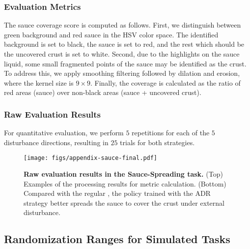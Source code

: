 \begin{appendix}
\subsubsection{Evaluation Metrics}
\label{sec:appendix-disturb-metric}
The sauce coverage score is computed as follows. First, we distinguish between green background and red sauce in the HSV color space. The identified background is set to black, the sauce is set to red, and the rest which should be the uncovered crust is set to white. Second, due to the highlights on the sauce liquid, some small fragmented points of the sauce may be identified as the crust. To address this, we apply smoothing filtering followed by dilation and erosion, where the kernel size is $9\times 9$. Finally, the coverage is calculated as the ratio of red areas (sauce) over non-black areas (sauce + uncovered crust). 

\vspace{0.2cm}
\subsubsection{Raw Evaluation Results}
\label{sec:appendix-disturb-raw}
For quantitative evaluation, we perform $5$ repetitions for each of the $5$ disturbance directions, resulting in $25$ trials for both strategies. 

\end{appendix}


\begin{figure}
    \centering
    \texttt{[image: figs/appendix-sauce-final.pdf]}
    \caption{\textbf{Raw evaluation results in the Sauce-Spreading task.} (Top) Examples of the processing results for metric calculation. (Bottom) Compared with the regular \method, the policy trained with the ADR strategy better spreads the sauce to cover the crust under external disturbance.}
    \label{fig:sauce-raw-results}
    \vspace{-0.2cm}
\end{figure}





\subsection{Randomization Ranges for Simulated Tasks}
\label{sec:appendix-sim-range}




